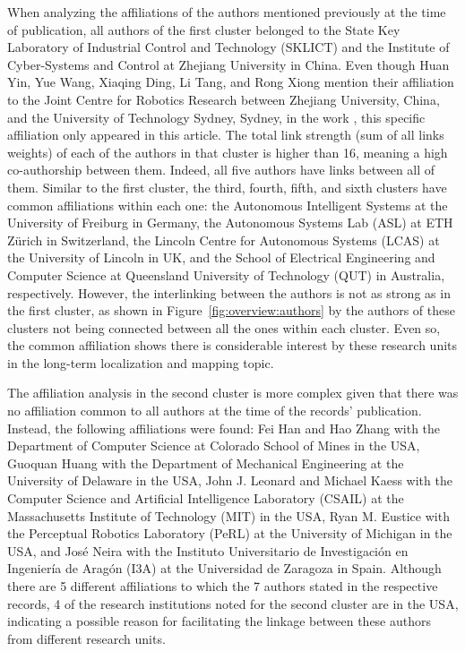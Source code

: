 When analyzing the affiliations of the authors mentioned previously at the time of publication, all authors of the first cluster belonged to the State Key Laboratory of Industrial Control and Technology (SKLICT) and the Institute of Cyber-Systems and Control at Zhejiang University in China. Even though Huan Yin, Yue Wang, Xiaqing Ding, Li Tang, and Rong Xiong mention their affiliation to the Joint Centre for Robotics Research between Zhejiang University, China, and the University of Technology Sydney, Sydney, in the work \cite{yin-et-al:2020:2905046}, this specific affiliation only appeared in this article. The total link strength (sum of all links weights) of each of the authors in that cluster is higher than 16, meaning a high co-authorship between them. Indeed, all five authors have links between all of them.
Similar to the first cluster, the third, fourth, fifth, and sixth clusters have common affiliations within each one: the Autonomous Intelligent Systems at the University of Freiburg in Germany, the Autonomous Systems Lab (ASL) at ETH Zürich in Switzerland, the Lincoln Centre for Autonomous Systems (LCAS) at the University of Lincoln in UK, and the School of Electrical Engineering and Computer Science at Queensland University of Technology (QUT) in Australia, respectively.
However, the interlinking between the authors is not as strong as in the first cluster, as shown in Figure~\ref{fig:overview:authors} by the authors of these clusters not being connected between all the ones within each cluster. Even so, the common affiliation shows there is considerable interest by these research units in the long-term localization and mapping topic.

The affiliation analysis in the second cluster is more complex given that there was no affiliation common to all authors at the time of the records' publication. Instead, the following affiliations were found: Fei Han and Hao Zhang with the Department of Computer Science at Colorado School of Mines in the USA, Guoquan Huang with the Department of Mechanical Engineering at the University of Delaware in the USA, John J. Leonard and Michael Kaess with the Computer Science and Artificial Intelligence Laboratory (CSAIL) at the Massachusetts Institute of Technology (MIT) in the USA, Ryan M. Eustice with the Perceptual Robotics Laboratory (PeRL) at the University of Michigan in the USA, and José Neira with the Instituto Universitario de Investigación en Ingeniería de Aragón (I3A) at the Universidad de Zaragoza in Spain.
Although there are 5 different affiliations to which the 7 authors stated in the respective records, 4 of the research institutions noted for the second cluster are in the USA, indicating a possible reason for facilitating the linkage between these authors from different research units.

